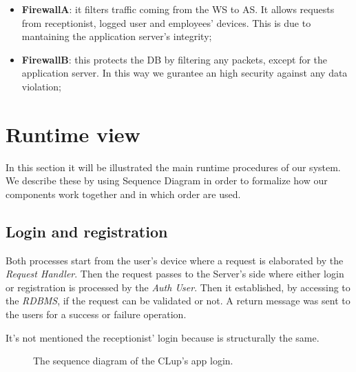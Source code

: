 \begin{itemize}

\item \textbf{FirewallA}: it filters traffic coming from the WS to AS. It allows requests from receptionist, logged user and employees' devices. This is due to mantaining the application server's integrity;

\item \textbf{FirewallB}: this protects the DB by filtering any packets, except for the application server. In this way we gurantee an high security against any data violation; 
\end{itemize}




\section{Runtime view}
In this section it will be illustrated the main runtime procedures of our system. We describe these by using Sequence Diagram in order to formalize how our components work together and in which order are used.


\subsection{Login and registration}

Both processes start from the user's device where a request is elaborated by the \textit{Request Handler}. Then the request passes to the Server's side where either login or registration is processed by the \textit{Auth User}. Then it established, by accessing to the \textit{RDBMS}, if the request can be validated or not. A return message was sent to the users for a success or failure operation. 

It's not mentioned the receptionist' login because is structurally the same.



\begin{figure}[H]
  \label{LoginSD}
  \centering
    \caption{The sequence diagram of the CLup's app login.}
\end{figure} 


